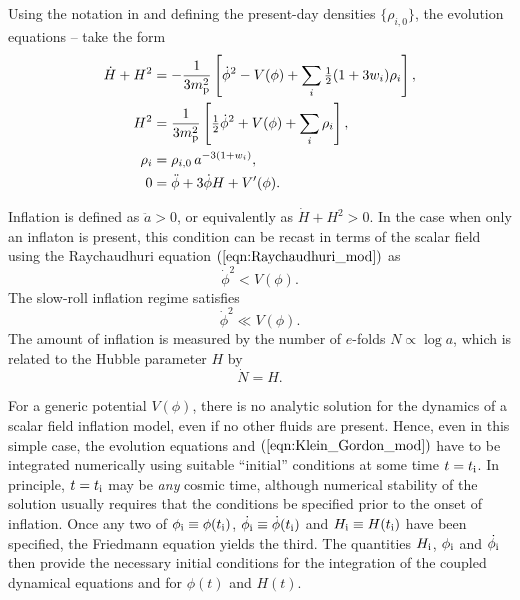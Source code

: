 Using the notation in  and defining the
present-day densities $\{\rho_{i,0}\}$, the evolution equations
-- take the form 
%
\begin{align}
  \dot{H}+H^2 &= 
  -\frac{1}{3m_{\mathrm{p}}^2}\left[\dot{\phi}^2 - V(\phi) +
  \sum_i{\textstyle\frac{1}{2}}(1+3w_i)\rho_i\right] ,
  \label{eqn:Raychaudhuri_mod}
  \\
  H^2 &= 
  \frac{1}{3m_{\mathrm{p}}^2}\left[{\textstyle\frac{1}{2}}\dot{\phi}^2 + V(\phi) +
  \sum_i\rho_i\right],
  \label{eqn:Friedmann_mod} 
  \\
  \rho_i &= 
  \rho_{i,0} \,a^{-3(1+w_i)},
  \label{eqn:rho_a} 
  \\ 
  0&= 
  \ddot{\phi} +3\dot{\phi}H + V^\prime(\phi).
  \label{eqn:Klein_Gordon_mod}
\end{align}
%                                                          

Inflation is defined as $\ddot{a}>0$, or equivalently as
$\dot{H}+H^2>0$. In the case when only an inflaton is present, this
condition can be recast in terms of the scalar field using the
Raychaudhuri equation $\eref{eqn:Raychaudhuri_mod}$ as
%
\begin{equation}
  \dot{\phi}^2<V(\phi).
  \label{eqn:Onset_inflation}
\end{equation}
%
The slow-roll inflation regime satisfies
%
\begin{equation}
  \dot{\phi}^2\ll V(\phi).
  \label{eqn:Slow-roll}
\end{equation}
%
The amount of inflation is measured by the number of $e$-folds
$N\propto \log a$, which is related to the Hubble parameter $H$ by
%
\begin{equation}
  \dot{N}=H.\label{eqn:e-folds}
\end{equation}
%

For a generic potential $V(\phi)$, there is no analytic solution for
the dynamics of a scalar field inflation model, even if no other
fluids are present. Hence, even in this simple case, the evolution
equations  and
$\eref{eqn:Klein_Gordon_mod}$ have to be integrated numerically using
suitable ``initial'' conditions at some time $t=t_{\mathrm{i}}$. In principle,
$t=t_{\mathrm{i}}$ may be {\em any}\/ cosmic time, although numerical stability of
the solution usually requires that the conditions be specified prior
to the onset of inflation.  Once any two of $\phi_{\mathrm{i}} \equiv \phi(t_{\mathrm{i}})$,
$\dot{\phi_{\mathrm{i}}} \equiv \dot{\phi}(t_{\mathrm{i}})$ and $H_{\mathrm{i}} \equiv H(t_{\mathrm{i}})$ have been
specified, the Friedmann equation  yields the
third. The quantities $H_{\mathrm{i}}$, $\phi_{\mathrm{i}}$ and $\dot{\phi_{\mathrm{i}}}$ then provide
the necessary initial conditions for the integration of the coupled
dynamical equations  and
 for $\phi(t)$ and $H(t)$.

